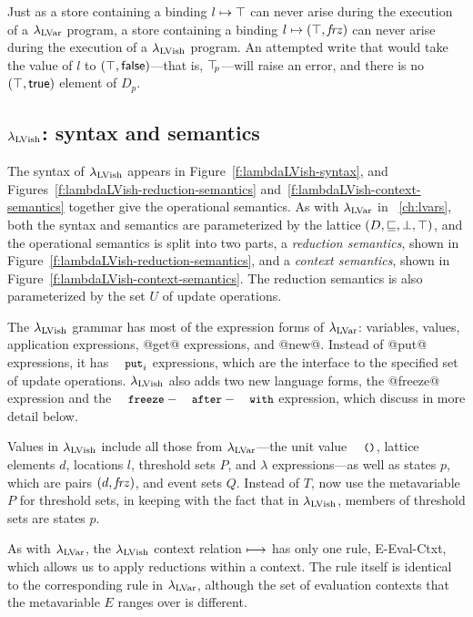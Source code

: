 \noindent Just as a store containing a binding $l \mapsto \top$ can
never arise during the execution of a $\lambda_{\textrm{LVar}}$ program, a store
containing a binding $l \mapsto (\top, \mathit{frz})$ can never arise
during the execution of a $\lambda_{\textrm{LVish}}$ program. An attempted write
that would take the value of $l$ to
$(\top, \textsf{false})$---that is, $\top\hspace{-0.85mm}_{p}$---will raise an error,
and there is no $(\top, \textsf{true})$ element of $D_p$.

\subsection{$\lambda_{\textrm{LVish}}$: syntax and semantics}

The syntax of $\lambda_{\textrm{LVish}}$ appears in
Figure~\ref{f:lambdaLVish-syntax}, and
Figures~\ref{f:lambdaLVish-reduction-semantics}
and~\ref{f:lambdaLVish-context-semantics} together give the
operational semantics.  As with $\lambda_{\textrm{LVar}}$ in
~\ref{ch:lvars}, both the syntax and semantics are
parameterized by the lattice $(D, \sqsubseteq, \bot, \top)$, and the
operational semantics is split into two parts, a \emph{reduction
  semantics}, shown in
Figure~\ref{f:lambdaLVish-reduction-semantics}, and a
\emph{context semantics}, shown in
Figure~\ref{f:lambdaLVish-context-semantics}.  The reduction
semantics is also parameterized by the set $U$ of update operations.

\FigLambdaLVishGrammar

The $\lambda_{\textrm{LVish}}$ grammar has most of the expression forms of
$\lambda_{\textrm{LVar}}$: variables, values, application expressions, @get@
expressions, and @new@.  Instead of @put@ expressions, it has $\PUTi$
expressions, which are the interface to the specified set of update
operations.  $\lambda_{\textrm{LVish}}$ also adds two new language forms, the
@freeze@ expression and the $\FAW$ expression, which  discuss in more
detail below.

Values in $\lambda_{\textrm{LVish}}$ include all those from $\lambda_{\textrm{LVar}}$---the
unit value $\unit$, lattice elements $d$, locations $l$, threshold
sets $P$, and $\lambda$ expressions---as well as states $p$, which are
pairs $(d, \mathit{frz})$, and event sets $Q$.  Instead of $T$,  now
use the metavariable $P$ for threshold sets, in keeping with the fact
that in $\lambda_{\textrm{LVish}}$, members of threshold sets are states $p$.

As with $\lambda_{\textrm{LVar}}$, the $\lambda_{\textrm{LVish}}$ context relation
$\longmapsto$ has only one rule, {\sc E-Eval-Ctxt}, which allows us to
apply reductions within a context. The rule itself is identical to the
corresponding rule in $\lambda_{\textrm{LVar}}$, although the set of evaluation
contexts that the metavariable $E$ ranges over is different.

